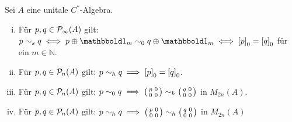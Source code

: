 \begin{proposition}[label=prop:68]
	Sei $A$ eine unitale $C^*$-Algebra.
	\begin{enumerate}[(i)]
		\item Für $p,q \in \Pinfty(A)$ gilt: $p \sim_s q \iff p \oplus \ind_m \sim_0 q \oplus \ind_m \iff \benbrace*{p}_0 = \benbrace*{q}_0$ für ein $m \in \mathbb{N}$.
		\item Für $p,q \in \kernedP_n(A)$ gilt: $p \sim_h q \implies \benbrace*{p}_0 = \benbrace*{q}_0$.
		\item Für $p,q \in \kernedP_n(A)$ gilt: $p \sim_0 q \implies \begin{psmallmatrix} p &0 \\ 0 & 0 \end{psmallmatrix} \sim_h \begin{psmallmatrix} q &0 \\ 0 & 0 \end{psmallmatrix}$ in $M_{2n}(A)$.
		\item Für $p,q \in \kernedP_n(A)$ gilt: $p \sim_h q \implies \begin{psmallmatrix} p &0 \\ 0 & 0 \end{psmallmatrix} \sim_h \begin{psmallmatrix} q &0 \\ 0 & 0 \end{psmallmatrix}$ in $M_{2n}(A)$
	\end{enumerate}
\end{proposition}
